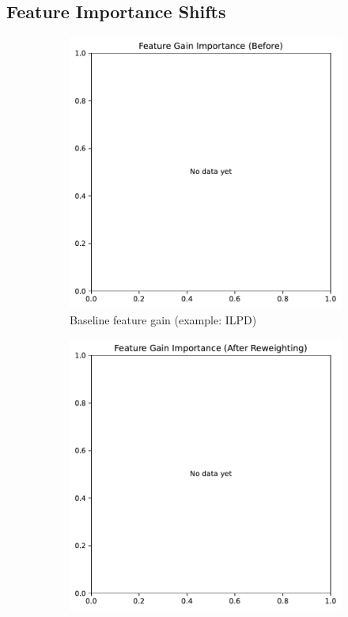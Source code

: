 \documentclass[sn-basic]{sn-jnl} %
\begin{document}
\subsection{Feature Importance Shifts}
\begin{figure}[H]
  \centering
  \begin{subfigure}{.49\linewidth}
    \centering
    \includegraphics[width=\linewidth]{fig_feat_gain_before.pdf}%
    \caption{Baseline feature gain (example: ILPD)}
  \end{subfigure}\hfill
  \begin{subfigure}{.49\linewidth}
    \centering
    \includegraphics[width=\linewidth]{fig_feat_gain_after.pdf}%

\end{subfigure}
\end{figure}
\end{document}
